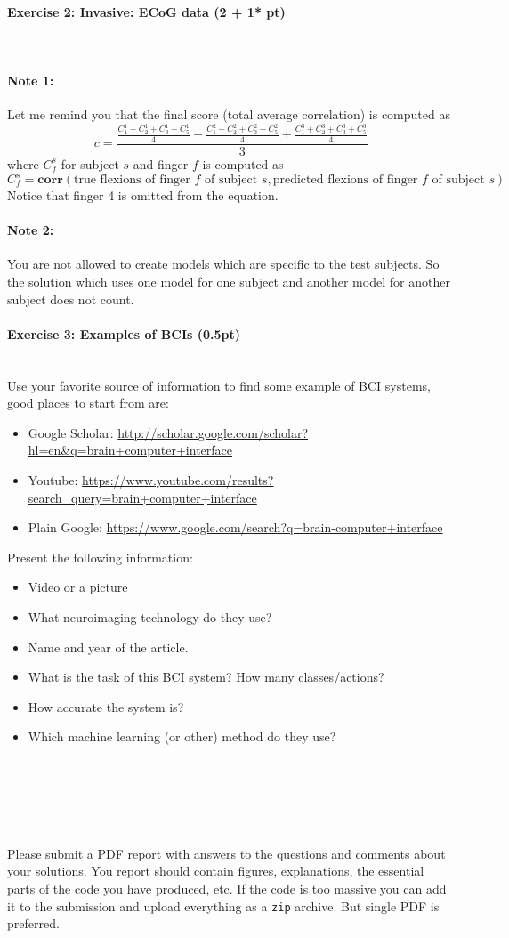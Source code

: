 \documentclass[a4paper,11pt]{article}
\newenvironment{exercise}[3]{\paragraph{Exercise #1: #2 (#3pt)}\ \\}{
\medskip}
\begin{document}
\begin{exercise}{2}{Invasive: ECoG data}{2 + 1* }
\paragraph{Note 1:} Let me remind you that the final score (total average correlation) is computed as
$$c = \displaystyle\frac{\displaystyle\frac{C^1_1 + C^1_2 + C^1_3 + C^1_5}{4} + \frac{C^2_1 + C^2_2 + C^2_3 + C^2_5}{4} + \frac{C^3_1 + C^3_2 + C^3_3 + C^3_5}{4}}{3}$$
where $C^s_f$ for subject $s$ and finger $f$ is computed as
$$C^s_f = \mathbf{corr}(\text{true flexions of finger $f$ of subject $s$}, \text{predicted flexions of finger $f$ of subject $s$})$$
Notice that finger 4 is omitted from the equation.

\paragraph{Note 2:} You are not allowed to create models which are specific to the test subjects. So the solution which uses one model for one subject and another model for another subject does not count.

\end{exercise}


%
%
\begin{exercise}{3}{Examples of BCIs}{0.5}
Use your favorite source of information to find some example of BCI systems, good places to start from are:
\begin{itemize}
\itemsep 0em
	\item Google Scholar: \url{http://scholar.google.com/scholar?hl=en&q=brain+computer+interface}
	\item Youtube: \url{https://www.youtube.com/results?search_query=brain+computer+interface}
	\item Plain Google: \url{https://www.google.com/search?q=brain-computer+interface}
\end{itemize}
Present the following information:
\begin{itemize}
\itemsep 0em
	\item Video or a picture
	\item What neuroimaging technology do they use?
	\item Name and year of the article.
	\item What is the task of this BCI system? How many classes/actions?
	\item How accurate the system is?
	\item Which machine learning (or other) method do they use?
\end{itemize}
\end{exercise}


\ \\
\ \\
\ \\
\ \\
\ \\
Please submit a PDF report with answers to the questions and comments about your solutions. You report should contain figures, explanations, the essential parts of the code you have produced, etc. If the code is too massive you can add it to the submission and upload everything as a \texttt{zip} archive. But single PDF is preferred.
\end{document}
